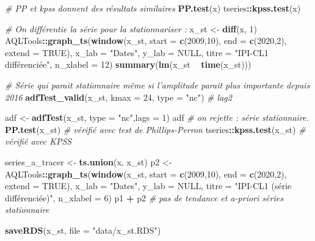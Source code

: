 \documentclass[french]{article}
\newenvironment{Shaded}{\begin{snugshade}}{\end{snugshade}}
\newcommand{\CommentTok}[1]{\textcolor[rgb]{0.56,0.35,0.01}{\textit{#1}}}
\newcommand{\DataTypeTok}[1]{\textcolor[rgb]{0.13,0.29,0.53}{#1}}
\newcommand{\DecValTok}[1]{\textcolor[rgb]{0.00,0.00,0.81}{#1}}
\newcommand{\KeywordTok}[1]{\textcolor[rgb]{0.13,0.29,0.53}{\textbf{#1}}}
\newcommand{\NormalTok}[1]{#1}
\newcommand{\OperatorTok}[1]{\textcolor[rgb]{0.81,0.36,0.00}{\textbf{#1}}}
\newcommand{\OtherTok}[1]{\textcolor[rgb]{0.56,0.35,0.01}{#1}}
\newcommand{\StringTok}[1]{\textcolor[rgb]{0.31,0.60,0.02}{#1}}
\begin{document}
\begin{Shaded}
\begin{Highlighting}[]
\CommentTok{# PP et kpss donnent des résultats similaires}
\KeywordTok{PP.test}\NormalTok{(x) }
\NormalTok{tseries}\OperatorTok{::}\KeywordTok{kpss.test}\NormalTok{(x)}


\CommentTok{# On différentie la série pour la stationnariser :}
\NormalTok{x_st <-}\StringTok{ }\KeywordTok{diff}\NormalTok{(x, }\DecValTok{1}\NormalTok{)}
\NormalTok{AQLTools}\OperatorTok{::}\KeywordTok{graph_ts}\NormalTok{(}\KeywordTok{window}\NormalTok{(x_st,}
                          \DataTypeTok{start =} \KeywordTok{c}\NormalTok{(}\DecValTok{2009}\NormalTok{,}\DecValTok{10}\NormalTok{),}
                          \DataTypeTok{end =} \KeywordTok{c}\NormalTok{(}\DecValTok{2020}\NormalTok{,}\DecValTok{2}\NormalTok{),}
                          \DataTypeTok{extend =} \OtherTok{TRUE}\NormalTok{), }\DataTypeTok{x_lab =} \StringTok{"Dates"}\NormalTok{, }\DataTypeTok{y_lab =} \OtherTok{NULL}\NormalTok{,}
                   \DataTypeTok{titre =} \StringTok{"IPI-CL1 différenciée"}\NormalTok{, }\DataTypeTok{n_xlabel =} \DecValTok{12}\NormalTok{)}
\KeywordTok{summary}\NormalTok{(}\KeywordTok{lm}\NormalTok{(x_st }\OperatorTok{~}\StringTok{ }\KeywordTok{time}\NormalTok{(x_st)))}

\CommentTok{# Série qui parait stationnaire même si l'amplitude parait plus importante depuis 2016}
\KeywordTok{adfTest_valid}\NormalTok{(x_st, }\DataTypeTok{kmax =} \DecValTok{24}\NormalTok{, }\DataTypeTok{type =} \StringTok{"nc"}\NormalTok{) }\CommentTok{# lag2}

\NormalTok{adf <-}\StringTok{ }\KeywordTok{adfTest}\NormalTok{(x_st, }\DataTypeTok{type =} \StringTok{"nc"}\NormalTok{,}\DataTypeTok{lags =} \DecValTok{1}\NormalTok{)}
\NormalTok{adf }\CommentTok{# on rejette : série stationnaire.}
\KeywordTok{PP.test}\NormalTok{(x_st) }\CommentTok{# vérifié avec test de Phillips-Perron}
\NormalTok{tseries}\OperatorTok{::}\KeywordTok{kpss.test}\NormalTok{(x_st) }\CommentTok{# vérifié avec KPSS}

\NormalTok{series_a_tracer <-}\StringTok{ }\KeywordTok{ts.union}\NormalTok{(x, x_st)}
\NormalTok{p2 <-}\StringTok{ }\NormalTok{AQLTools}\OperatorTok{::}\KeywordTok{graph_ts}\NormalTok{(}\KeywordTok{window}\NormalTok{(x_st,}
                                \DataTypeTok{start =} \KeywordTok{c}\NormalTok{(}\DecValTok{2009}\NormalTok{,}\DecValTok{10}\NormalTok{),}
                                \DataTypeTok{end =} \KeywordTok{c}\NormalTok{(}\DecValTok{2020}\NormalTok{,}\DecValTok{2}\NormalTok{),}
                                \DataTypeTok{extend =} \OtherTok{TRUE}\NormalTok{), }\DataTypeTok{x_lab =} \StringTok{"Dates"}\NormalTok{, }\DataTypeTok{y_lab =} \OtherTok{NULL}\NormalTok{,}
                         \DataTypeTok{titre =} \StringTok{"IPI-CL1 (série différenciée)"}\NormalTok{, }\DataTypeTok{n_xlabel =} \DecValTok{6}\NormalTok{)}
\NormalTok{p1 }\OperatorTok{+}\StringTok{ }\NormalTok{p2 }\CommentTok{# pas de tendance et a-priori séries stationnaire}

\KeywordTok{saveRDS}\NormalTok{(x_st, }\DataTypeTok{file =} \StringTok{"data/x_st.RDS"}\NormalTok{)}
\end{Highlighting}
\end{Shaded}
\end{document}
